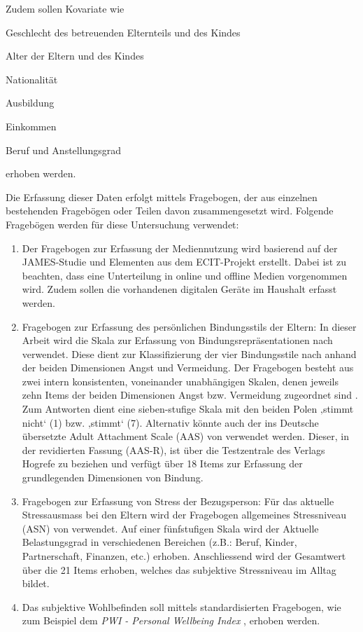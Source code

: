 Zudem sollen Kovariate wie 
\begin{seriate}
    \item Geschlecht des betreuenden Elternteils und des Kindes
    \item Alter der Eltern und des Kindes
    \item Nationalität
    \item Ausbildung
    \item Einkommen
    \item Beruf und Anstellungsgrad
\end{seriate}
erhoben werden.

Die Erfassung dieser Daten erfolgt mittels Fragebogen, der aus einzelnen bestehenden Fragebögen oder Teilen davon zusammengesetzt wird. Folgende Fragebögen werden für diese Untersuchung verwendet:
\begin{enumerate}
    \item Der Fragebogen zur Erfassung der Mediennutzung wird basierend auf der JAMES-Studie \cite{Waller2016} und Elementen aus dem ECIT-Projekt \cite{Konitzer2017} erstellt. Dabei ist zu beachten, dass eine Unterteilung in online und offline Medien vorgenommen wird. Zudem sollen die vorhandenen digitalen Geräte im Haushalt erfasst werden.
    \item Fragebogen zur Erfassung des persönlichen Bindungsstils der Eltern: 
In dieser Arbeit wird die Skala zur Erfassung von Bindungsrepräsentationen nach  verwendet. Diese dient zur Klassifizierung der vier Bindungsstile nach  anhand der beiden Dimensionen Angst und Vermeidung. Der Fragebogen besteht aus zwei intern konsistenten, voneinander unabhängigen Skalen, denen jeweils zehn Items der beiden Dimensionen Angst bzw. Vermeidung zugeordnet sind \cite{Baadte2006}. Zum Antworten dient eine sieben-stufige Skala mit den beiden Polen ‚stimmt nicht‘ (1) bzw. ‚stimmt‘ (7). Alternativ könnte auch der ins Deutsche übersetzte Adult Attachment Scale (AAS) von  verwendet werden. Dieser, in der revidierten Fassung (AAS-R),  ist über die Testzentrale des Verlags Hogrefe zu beziehen und verfügt über 18 Items zur Erfassung der grundlegenden Dimensionen von Bindung.
    \item Fragebogen zur Erfassung von Stress der Bezugsperson: Für das aktuelle Stressausmass bei den Eltern wird der Fragebogen allgemeines Stressniveau (ASN) von  verwendet. Auf einer fünfstufigen Skala wird der Aktuelle Belastungsgrad in verschiedenen Bereichen (z.B.: Beruf, Kinder, Partnerschaft, Finanzen, etc.) erhoben. Anschliessend wird der Gesamtwert über die 21 Items erhoben, welches das subjektive Stressniveau im Alltag bildet.
    
    \item Das subjektive Wohlbefinden soll mittels standardisierten Fragebogen, wie zum Beispiel dem \textit{PWI - Personal Wellbeing Index}  \cite{TheInternationalWellBeingGroup2006}, erhoben werden. 
\end{enumerate}

